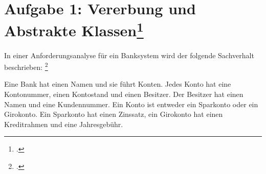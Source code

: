 \documentclass{lehramt-informatik-minimal}
\begin{document}
\section{Aufgabe 1: Vererbung und Abstrakte Klassen\footcite[(entnommen
aus Algorithmen und Datenstrukturen, 3. \& 4. Übungsblatt, Universität
Bayreuth)]{aud:pu:7}}

\def\TmpHinweis#1{{\footnotesize[#1]}}

In einer Anforderungsanalyse für ein
Banksystem wird der folgende Sachverhalt beschrieben:
\footcite[Objektorientierte Modellierung (aus Stex vertieft
Automatentheorie, Komplexität, Algorithmen, Herbst 02, Thema Nr. 1,
Aufgabe 4)]{examen:66112:2002:09}

Eine Bank hat einen Namen und sie führt Konten. Jedes Konto hat eine
Kontonummer, einen Kontostand und einen Besitzer. Der Besitzer hat einen
Namen und eine Kundennummer. Ein Konto ist entweder ein Sparkonto oder
ein Girokonto. Ein Sparkonto hat einen Zinssatz, ein Girokonto hat einen
Kreditrahmen und eine Jahresgebühr.
\end{document}
